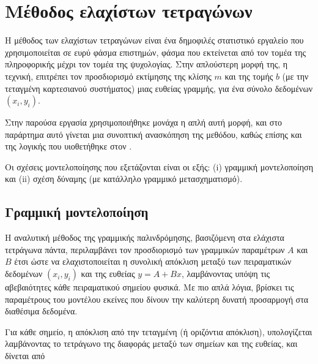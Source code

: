 


\chapter{Μέθοδος ελαχίστων τετραγώνων}\label{app:lsqAppendix}
\begin{refsection}

\noindent Η μέθοδος των ελαχίστων τετραγώνων είναι ένα δημοφιλές στατιστικό εργαλείο που χρησιμοποιείται σε ευρύ φάσμα επιστημών, φάσμα που εκτείνεται από τον τομέα της πληροφορικής μέχρι τον τομέα της ψυχολογίας. Στην απλούστερη μορφή της, η τεχνική, επιτρέπει τον προσδιορισμό εκτίμησης της κλίσης $m$ και της τομής $b$ (με την τεταγμένη καρτεσιανού συστήματος) μιας ευθείας γραμμής, για ένα σύνολο δεδομένων $(x_i, y_i)$.

Στην παρούσα εργασία χρησιμοποιήθηκε μονάχα η απλή αυτή μορφή, και στο παράρτημα αυτό γίνεται μια συνοπτική ανασκόπηση της μεθόδου, καθώς επίσης και της λογικής που υιοθετήθηκε στον .

Οι σχέσεις μοντελοποίησης που εξετάζονται είναι οι εξής: (i) γραμμική μοντελοποίηση και (ii) σχέση δύναμης (με κατάλληλο γραμμικό μετασχηματισμό).

\section*{Γραμμική μοντελοποίηση}

\noindent Η αναλυτική μέθοδος της γραμμικής παλινδρόμησης, βασιζόμενη στα ελάχιστα τετράγωνα πάντα, περιλαμβάνει τον προσδιορισμό των γραμμικών παραμέτρων $A$ και $B$ έτσι ώστε να ελαχιστοποιείται η συνολική απόκλιση μεταξύ των πειραματικών δεδομένων $(x_i, y_i)$ και της ευθείας $y = A + Bx$, λαμβάνοντας υπόψη τις αβεβαιότητες κάθε πειραματικού σημείου φυσικά. Με πιο απλά λόγια, βρίσκει τις παραμέτρους του μοντέλου εκείνες που δίνουν την καλύτερη δυνατή προσαρμογή στα διαθέσιμα δεδομένα.

Για κάθε σημείο, η απόκλιση από την τεταγμένη (ή οριζόντια απόκλιση), υπολογίζεται λαμβάνοντας το τετράγωνο της διαφοράς μεταξύ των σημείων και της ευθείας, και δίνεται από


\end{refsection}
